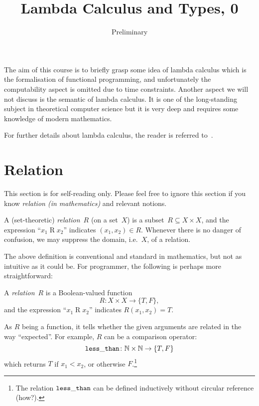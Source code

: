 \title{Lambda Calculus and Types, 0}
\subtitle{Preliminary}

\begin{frame}
\maketitle
\end{frame}

The aim of this course is to briefly grasp some idea of lambda
calculus which is the formalisation of functional programming, and unfortunately
the computability aspect is omitted due to time constraints. Another aspect we
will not discuss is the semantic of lambda calculus. It is one of the
long-standing subject in theoretical computer science but it is very deep
and requires some knowledge of modern mathematics. 

For further details about lambda calculus, the reader is referred
to~\cite{Barendregt1984,Barendregt1992,Barendregt1984a}. 

\section{Relation}
This section is for self-reading only. Please feel free to ignore this section
if you know \emph{relation (in mathematics)} and relevant notions.

\begin{definition}
  A (set-theoretic) \emph{relation}~$R$ (on a set~$X$) is a subset~$R
  \subseteq X \times X$, and the expression ``$x_1 \mathbin{R} x_2$'' indicates
  $(x_1, x_2) \in R$.  Whenever there is no danger of confusion, we may suppress
  the domain, i.e.\ $X$, of a relation. 
\end{definition}

The above definition is conventional and standard in mathematics, but not as
intuitive as it could be. For programmer, the following is perhaps more
straightforward:
\begin{definition}[Functional]
  A \emph{relation}~$R$ is a Boolean-valued function 
  \[
    R\colon X \times X \to \{T, F\},
  \]
  and the expression ``$x_1 \mathbin{R} x_2$'' indicates $R(x_1, x_2) = T$.
\end{definition}

As $R$ being a function, it tells whether the given arguments are related in the
way ``expected''. For example, $R$ can be a comparison operator:
\[
  {\tt less\_than}\colon \mathbb{N} \times \mathbb{N} \to \{T, F\}
\]
which returns $T$ if $x_1 < x_2$, or otherwise $F$.\footnote{%
  The relation ${\tt less\_than}$ can be defined inductively without circular
  reference (how?).}

